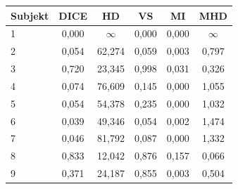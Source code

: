 \begin{tabular}{l c c c c c}
 \hline
Subjekt & DICE & HD & VS & MI & MHD \\ \hline
1 & 0,000 & $\infty$ & 0,000 & 0,000 & $\infty$ \\
2 & 0,054 & 62,274 & 0,059 & 0,003 & 0,797 \\
3 & 0,720 & 23,345 & 0,998 & 0,031 & 0,326 \\
4 & 0,074 & 76,609 & 0,145 & 0,000 & 1,055 \\
5 & 0,054 & 54,378 & 0,235 & 0,000 & 1,032 \\
6 & 0,039 & 49,346 & 0,054 & 0,002 & 1,474 \\
7 & 0,046 & 81,792 & 0,087 & 0,000 & 1,332 \\
8 & 0,833 & 12,042 & 0,876 & 0,157 & 0,066 \\
9 & 0,371 & 24,187 & 0,855 & 0,003 & 0,504 \\
\hline 
 \end{tabular}
